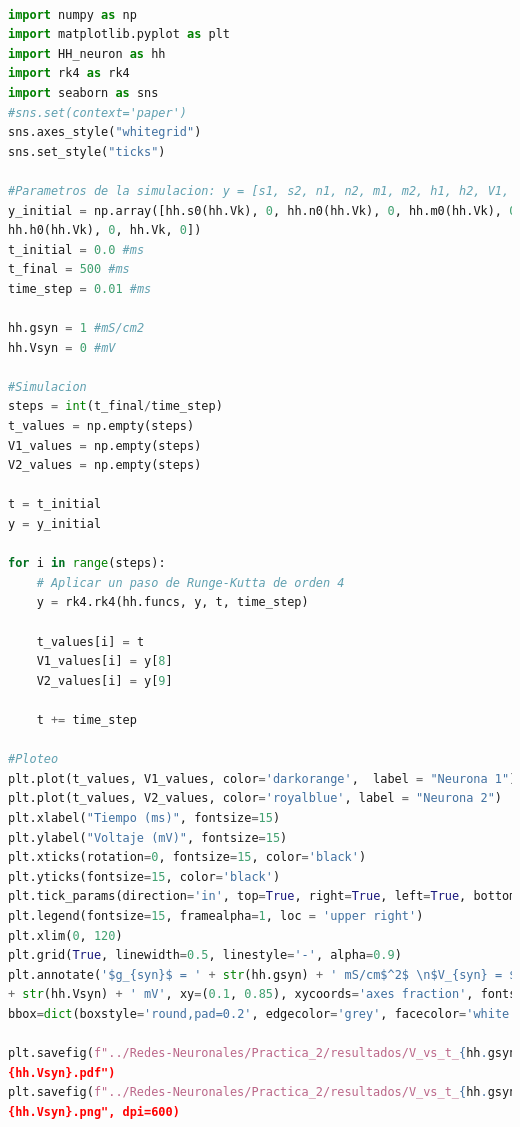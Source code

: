 \documentclass[11pt,twocolumn,twoside]{opticajnl}
\begin{document}
\begin{onecolumn}
\begin{lstlisting}[language=Python, caption={Simulación de una interacción exitatoria o inhibitoria entre dos neuronas de Hodgkin y Huxley para un dado valor de $g_{syn}$.}, label=python-code]

import numpy as np
import matplotlib.pyplot as plt
import HH_neuron as hh
import rk4 as rk4
import seaborn as sns
#sns.set(context='paper')
sns.axes_style("whitegrid")
sns.set_style("ticks")

#Parametros de la simulacion: y = [s1, s2, n1, n2, m1, m2, h1, h2, V1, V2]
y_initial = np.array([hh.s0(hh.Vk), 0, hh.n0(hh.Vk), 0, hh.m0(hh.Vk), 0, 
hh.h0(hh.Vk), 0, hh.Vk, 0])
t_initial = 0.0 #ms
t_final = 500 #ms
time_step = 0.01 #ms

hh.gsyn = 1 #mS/cm2
hh.Vsyn = 0 #mV

#Simulacion
steps = int(t_final/time_step) 
t_values = np.empty(steps)
V1_values = np.empty(steps)
V2_values = np.empty(steps)

t = t_initial
y = y_initial

for i in range(steps):
    # Aplicar un paso de Runge-Kutta de orden 4
    y = rk4.rk4(hh.funcs, y, t, time_step)

    t_values[i] = t
    V1_values[i] = y[8]
    V2_values[i] = y[9]
    
    t += time_step

#Ploteo
plt.plot(t_values, V1_values, color='darkorange',  label = "Neurona 1")
plt.plot(t_values, V2_values, color='royalblue', label = "Neurona 2")
plt.xlabel("Tiempo (ms)", fontsize=15)
plt.ylabel("Voltaje (mV)", fontsize=15)
plt.xticks(rotation=0, fontsize=15, color='black')
plt.yticks(fontsize=15, color='black')
plt.tick_params(direction='in', top=True, right=True, left=True, bottom=True)
plt.legend(fontsize=15, framealpha=1, loc = 'upper right')
plt.xlim(0, 120)
plt.grid(True, linewidth=0.5, linestyle='-', alpha=0.9)
plt.annotate('$g_{syn}$ = ' + str(hh.gsyn) + ' mS/cm$^2$ \n$V_{syn} = $' 
+ str(hh.Vsyn) + ' mV', xy=(0.1, 0.85), xycoords='axes fraction', fontsize=12, 
bbox=dict(boxstyle='round,pad=0.2', edgecolor='grey', facecolor='white'))

plt.savefig(f"../Redes-Neuronales/Practica_2/resultados/V_vs_t_{hh.gsyn}_
{hh.Vsyn}.pdf")
plt.savefig(f"../Redes-Neuronales/Practica_2/resultados/V_vs_t_{hh.gsyn}_
{hh.Vsyn}.png", dpi=600)

\end{lstlisting}
    
\begin{lstlisting}[language=Python, caption={Código para calcular el desfasaje entre dos neuronas de Hodgkin y Huxley y la tasa de disparo, para un dado valor de $g_{syn}$} en una interacción exitatoria o inhibitoria , label=python-code]


\end{lstlisting}
\end{onecolumn}
\end{document}
